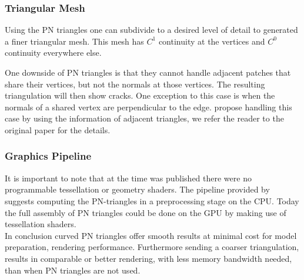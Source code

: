 \subsubsection*{Triangular Mesh}
Using the PN triangles one can subdivide to a desired level of detail to generated a finer triangular mesh. This mesh has $C^1$ continuity at the vertices and $C^0$ continuity everywhere else.  

One downside of PN triangles is that they cannot handle adjacent patches that share their vertices, but not the normals at those vertices. The resulting triangulation will then show cracks. One exception to this case is when the normals of a shared vertex are perpendicular to the edge. \citeauthor{vlachos2001curved} propose handling this case by using the information of adjacent triangles, we refer the reader to the original paper for the details.

\subsubsection*{Graphics Pipeline}
It is important to note that at the time \textcite{vlachos2001curved} was published there were no programmable tessellation or geometry shaders. The pipeline provided by \citeauthor{vlachos2001curved} suggests computing the PN-triangles in a preprocessing stage on the CPU. Today the full assembly of PN triangles could be done on the GPU by making use of tessellation shaders.\\

In conclusion curved PN triangles offer smooth results at minimal cost for model preparation, rendering performance. Furthermore sending a coarser triangulation, results in comparable or better rendering, with less memory bandwidth needed, than when PN triangles are not used. 
